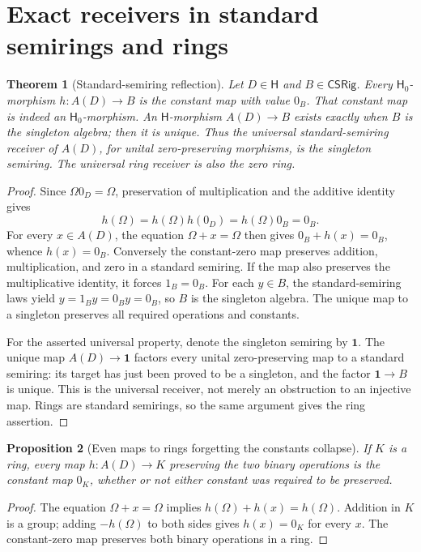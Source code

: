 \documentclass[11pt]{article}
\newtheorem{theorem}{Theorem}[section]
\newtheorem{proposition}[theorem]{Proposition}
\theoremstyle{definition}
\newcommand{\HH}{\mathsf H}
\newcommand{\HHZ}{\mathsf H_0}
\newcommand{\SSS}{\mathsf{CSRig}}
\newcommand{\Om}{\Omega}
\newcommand{\one}{\mathbf 1}
\begin{document}
\section{Exact receivers in standard semirings and rings}

\begin{theorem}[Standard-semiring reflection]\label{thm:reflection}
Let \(D\in\HH\) and \(B\in\SSS\). Every \(\HHZ\)-morphism
\(h:A(D)\to B\) is the constant map with value \(0_B\).
That constant map is indeed an \(\HHZ\)-morphism. An \(\HH\)-morphism
\(A(D)\to B\) exists exactly when \(B\) is the singleton algebra;
then it is unique. Thus the universal standard-semiring receiver of
\(A(D)\), for unital zero-preserving morphisms, is the singleton semiring.
The universal ring receiver is also the zero ring.
\end{theorem}
\begin{proof}
Since \(\Om0_D=\Om\), preservation of multiplication and the additive
identity gives
\[
 h(\Om)=h(\Om)h(0_D)=h(\Om)0_B=0_B.
\]
For every \(x\in A(D)\), the equation \(\Om+x=\Om\) then gives
\(0_B+h(x)=0_B\), whence \(h(x)=0_B\). Conversely the constant-zero
map preserves addition, multiplication, and zero in a standard semiring.
If the map also preserves the multiplicative identity, it forces
\(1_B=0_B\). For each \(y\in B\), the standard-semiring laws yield
\(y=1_By=0_By=0_B\), so \(B\) is the singleton algebra. The unique
map to a singleton preserves all required operations and constants.

For the asserted universal property, denote the singleton semiring by
\(\one\). The unique map \(A(D)\to\one\) factors every unital
zero-preserving map to a standard semiring: its target has just been proved
to be a singleton, and the factor \(\one\to B\) is unique. This is
the universal receiver, not merely an obstruction to an injective map.
Rings are standard semirings, so the same argument gives the ring assertion.
\end{proof}

\begin{proposition}[Even maps to rings forgetting the constants collapse]
If \(K\) is a ring, every map \(h:A(D)\to K\) preserving the two
binary operations is the constant map \(0_K\), whether or not either
constant was required to be preserved.
\end{proposition}
\begin{proof}
The equation \(\Om+x=\Om\) implies
\(h(\Om)+h(x)=h(\Om)\). Addition in \(K\) is a group; adding
\(-h(\Om)\) to both sides gives \(h(x)=0_K\) for every \(x\).
The constant-zero map preserves both binary operations in a ring.
\end{proof}
\end{document}
